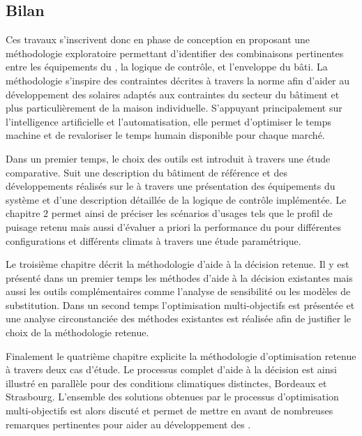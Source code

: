 \subsection{Bilan} %
\label{sub:bilan_methode}
Ces travaux s’inscrivent donc en phase de conception en proposant une méthodologie
exploratoire permettant d’identifier des combinaisons pertinentes entre les équipements du
, la logique de contrôle, et l’enveloppe du bâti. La méthodologie s’inspire des
contraintes décrites à travers la norme  afin d’aider au développement
des  solaires adaptés aux contraintes du secteur du bâtiment et plus
particulièrement de la maison individuelle. S’appuyant principalement sur
l’intelligence artificielle et l’automatisation, elle permet d’optimiser le temps machine
et de revaloriser le temps humain disponible pour chaque marché.

Dans un premier temps, le choix des outils est introduit à travers une étude comparative.
Suit une description du bâtiment de référence et des développements réalisés sur le
 à travers une présentation des équipements du système et d’une description détaillée
de la logique de contrôle implémentée. Le chapitre $2$ permet ainsi de préciser
les scénarios d’usages tels que le profil de puisage retenu mais aussi d’évaluer
a priori la performance du  pour différentes configurations et différents climats
à travers une étude paramétrique.

Le troisième chapitre décrit la méthodologie d’aide à la décision retenue. Il y est
présenté dans un premier temps les méthodes d’aide à la décision existantes mais
aussi les outils complémentaires comme l’analyse de sensibilité ou les modèles
de substitution. Dans un second temps l’optimisation multi-objectifs est présentée
et une analyse circonstanciée des méthodes existantes est réalisée afin de justifier
le choix de la méthodologie retenue.

Finalement le quatrième chapitre explicite la méthodologie d’optimisation retenue à
travers deux cas d’étude. Le processus complet d’aide à la décision est ainsi illustré
en parallèle pour des conditions climatiques distinctes, Bordeaux et Strasbourg. L’ensemble
des solutions obtenues par le processus d’optimisation multi-objectifs est alors discuté
et permet de mettre en avant de nombreuses remarques pertinentes pour aider au développement
des .
